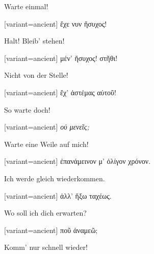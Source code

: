 Warte einmal!

\switchcolumn

\begin{greek}[variant=ancient]%
ἔχε νυν ἥσυχος!

\end{greek}%
\switchcolumn*

Halt! Bleib' stehen!

\switchcolumn

\begin{greek}[variant=ancient]%
μέν' ἥσυχος! στῆθι!

\end{greek}%
\switchcolumn*

Nicht von der Stelle!

\switchcolumn

\begin{greek}[variant=ancient]%
ἔχ' ἀστέμας αὐτοῦ!

\end{greek}%
\switchcolumn*

So warte doch!

\switchcolumn

\begin{greek}[variant=ancient]%
\emph{οὐ μενεῖς;}

\end{greek}%
\switchcolumn*

Warte eine Weile auf mich!

\switchcolumn

\begin{greek}[variant=ancient]%
ἐπανάμεινον μ' ὀλίγον χρόνον.

\end{greek}%
\switchcolumn*

Ich werde gleich wiederkommen.

\switchcolumn

\begin{greek}[variant=ancient]%
ἀλλ' ἥξω ταχέως.

\end{greek}%
\switchcolumn*

Wo soll ich dich erwarten?

\switchcolumn

\begin{greek}[variant=ancient]%
ποῦ ἀναμεῶ;

\end{greek}%
\switchcolumn*

Komm' nur schnell wieder!

\switchcolumn

